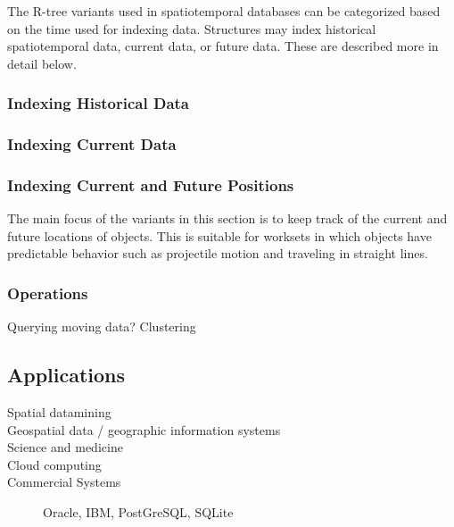 The R-tree variants used in spatiotemporal databases can be categorized based
on the time used for indexing data. Structures may index historical 
spatiotemporal data, current data, or future data. These are described more
in detail below.

\subsubsection{Indexing Historical Data}

\subsubsection{Indexing Current Data}

\subsubsection{Indexing Current and Future Positions}
The main focus of the variants in this section is to keep track of the current
and future locations of objects. This is suitable for worksets in which 
objects have predictable behavior such as projectile motion and traveling in
straight lines.

\subsubsection{Operations}
Querying moving data?
Clustering

\subsection{Applications}
\begin{description}
	\item[Spatial datamining]
	\item[Geospatial data / geographic information systems]
	\item[Science and medicine]
	\item[Cloud computing]
	\item[Commercial Systems] Oracle, IBM, PostGreSQL, SQLite
\end{description}


